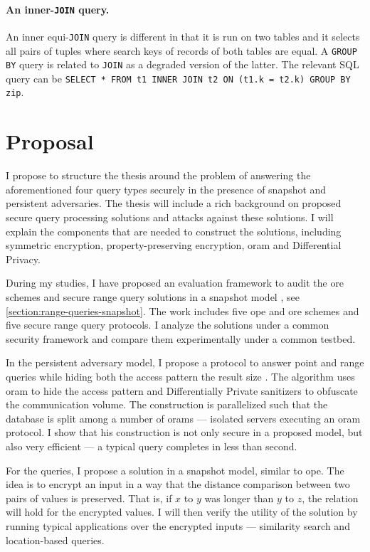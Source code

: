 		\paragraph*{An inner-\texttt{JOIN} query.}
			An inner equi-\texttt{JOIN} query is different in that it is run on two tables and it selects all pairs of tuples where search keys of records of both tables are equal.
			A \texttt{GROUP BY} query is related to \texttt{JOIN} as a degraded version of the latter.
			The relevant SQL query can be \texttt{SELECT * FROM t1 INNER JOIN t2 ON (t1.k = t2.k) GROUP BY zip}.

	\section{Proposal}

		I propose to structure the thesis around the problem of answering the aforementioned four query types securely in the presence of snapshot and persistent adversaries.
		The thesis will include a rich background on proposed secure query processing solutions and attacks against these solutions.
		I will explain the components that are needed to construct the solutions, including symmetric encryption, property-preserving encryption, \Gls{oram} and Differential Privacy.

		During my studies, I have proposed an evaluation framework to audit the \gls{ore} schemes and secure range query solutions in a snapshot model \cite{ore-benchmark-17}, see \cref{section:range-queries-snapshot}.
		The work includes five \gls{ope} and \gls{ore} schemes and five secure range query protocols.
		I analyze the solutions under a common security framework and compare them experimentally under a common testbed.

		In the persistent adversary model, I propose a protocol to answer point and range queries while hiding both the access pattern the result size \cite{epsolute}.
		The algorithm uses \Gls{oram} to hide the access pattern and Differentially Private sanitizers to obfuscate the communication volume.
		The construction is parallelized such that the database is split among a number of \Glspl{oram} --- isolated servers executing an \Gls{oram} protocol.
		I show that his construction is not only secure in a proposed model, but also very efficient --- a typical query completes in less than second.

		For the \knn{} queries, I propose a solution in a snapshot model, similar to \gls{ope}.
		The idea is to encrypt an input in a way that the distance comparison between two pairs of values is preserved.
		That is, if $x$ to $y$ was longer than $y$ to $z$, the relation will hold for the encrypted values.
		I will then verify the utility of the solution by running typical \knn{} applications over the encrypted inputs --- similarity search and location-based queries.

